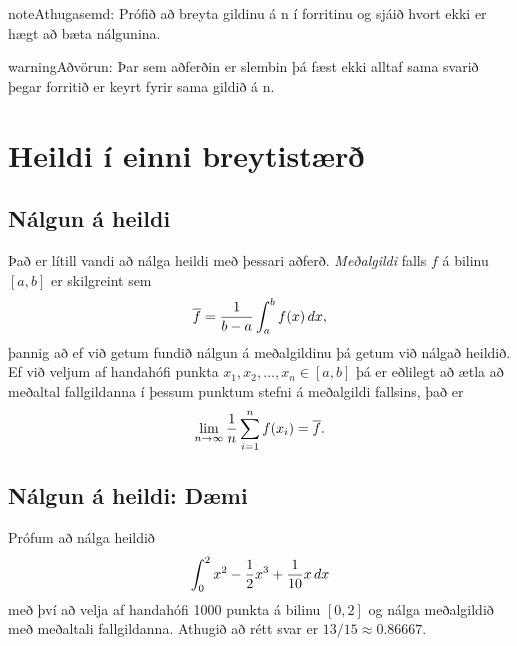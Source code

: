 \documentclass[letterpaper,10pt,icelandic]{sphinxmanual}
\begin{document}
\begin{notice}{note}{Athugasemd:}
Prófið að breyta gildinu á n í forritinu og sjáið hvort ekki er hægt að
bæta nálgunina.
\end{notice}

\begin{notice}{warning}{Aðvörun:}
Þar sem aðferðin er slembin þá fæst ekki alltaf sama svarið þegar forritið er keyrt fyrir sama
gildið á n.
\end{notice}


\section{Heildi í einni breytistærð}
\label{kafli10:heildi-i-einni-breytistaer}

\subsection{Nálgun á heildi}
\label{kafli10:nalgun-a-heildi}
Það er lítill vandi að nálga heildi með þessari aðferð. \emph{Meðalgildi} falls \(f\) á bilinu
\([a,b]\) er skilgreint sem
\begin{gather}
\begin{split}\overline f = \frac{1}{b-a} \int_a^b f(x)\, dx,\end{split}\notag
\end{gather}
þannig að ef við getum fundið nálgun á meðalgildinu þá getum við nálgað heildið.
Ef við veljum af handahófi punkta \(x_1,x_2,\ldots,x_n \in [a,b]\) þá er eðlilegt að
ætla að meðaltal fallgildanna í þessum punktum stefni á meðalgildi fallsins, það er
\begin{gather}
\begin{split}\lim_{n\to \infty} \frac 1n \sum_{i=1}^n f(x_i) = \overline f.\end{split}\notag
\end{gather}

\subsection{Nálgun á heildi: Dæmi}
\label{kafli10:nalgun-a-heildi-daemi}
Prófum að nálga heildið
\begin{gather}
\begin{split}\int_0^2 x^2 - \frac 12 x^3 + \frac 1{10}x\, dx\end{split}\notag
\end{gather}
með því að velja af handahófi 1000 punkta á bilinu \([0,2]\) og nálga meðalgildið með meðaltali
fallgildanna. Athugið að rétt svar er \(13/15 \approx 0.86667\).
\end{document}
